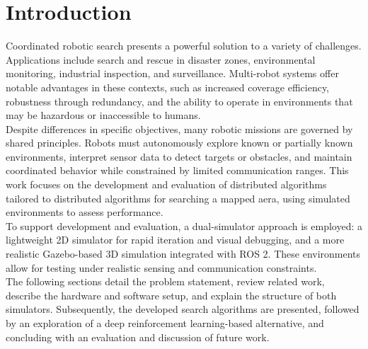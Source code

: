\section{Introduction}
\label{sec:Introduction}



Coordinated robotic search presents a powerful solution to a variety of challenges.
Applications include search and rescue in disaster zones, environmental monitoring, industrial inspection, and surveillance. 
Multi-robot systems offer notable advantages in these contexts, such as increased coverage efficiency, robustness through redundancy, and the ability to operate in environments that may be hazardous or inaccessible to humans.\\

Despite differences in specific objectives, many robotic missions are governed by shared principles. 
Robots must autonomously explore known or partially known environments, interpret sensor data to detect targets or obstacles, and maintain coordinated behavior while constrained by limited communication ranges. 
This work focuses on the development and evaluation of distributed algorithms tailored to distributed algorithms for searching a mapped aera, using simulated environments to assess performance.\\

To support development and evaluation, a dual-simulator approach is employed: a lightweight 2D simulator for rapid iteration and visual debugging, and a more realistic Gazebo-based 3D simulation integrated with ROS 2.
These environments allow for testing under realistic sensing and communication constraints.\\

The following sections detail the problem statement, review related work, describe the hardware and software setup, and explain the structure of both simulators. 
Subsequently, the developed search algorithms are presented, followed by an exploration of a deep reinforcement learning-based alternative, and concluding with an evaluation and discussion of future work.
